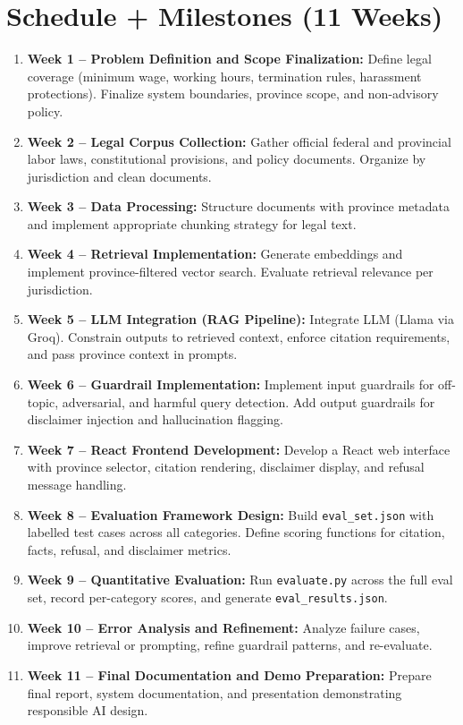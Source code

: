 \documentclass[10pt]{article}
\begin{document}
\section*{Schedule + Milestones (11 Weeks)}
\vspace{12pt}
\begin{enumerate}[leftmargin=*, itemsep=0pt, topsep=1pt]
\item \textbf{Week 1 – Problem Definition and Scope Finalization:} Define legal coverage (minimum wage, working hours, termination rules, harassment protections). Finalize system boundaries, province scope, and non-advisory policy.
\item \textbf{Week 2 – Legal Corpus Collection:} Gather official federal and provincial labor laws, constitutional provisions, and policy documents. Organize by jurisdiction and clean documents.
\item \textbf{Week 3 – Data Processing:} Structure documents with province metadata and implement appropriate chunking strategy for legal text.
\item \textbf{Week 4 – Retrieval Implementation:} Generate embeddings and implement province-filtered vector search. Evaluate retrieval relevance per jurisdiction.
\item \textbf{Week 5 – LLM Integration (RAG Pipeline):} Integrate LLM (Llama via Groq). Constrain outputs to retrieved context, enforce citation requirements, and pass province context in prompts.
\item \textbf{Week 6 – Guardrail Implementation:} Implement input guardrails for off-topic, adversarial, and harmful query detection. Add output guardrails for disclaimer injection and hallucination flagging.
\item \textbf{Week 7 – React Frontend Development:} Develop a React web interface with province selector, citation rendering, disclaimer display, and refusal message handling.
\item \textbf{Week 8 – Evaluation Framework Design:} Build \texttt{eval\_set.json} with labelled test cases across all categories. Define scoring functions for citation, facts, refusal, and disclaimer metrics.
\item \textbf{Week 9 – Quantitative Evaluation:} Run \texttt{evaluate.py} across the full eval set, record per-category scores, and generate \texttt{eval\_results.json}.
\item \textbf{Week 10 – Error Analysis and Refinement:} Analyze failure cases, improve retrieval or prompting, refine guardrail patterns, and re-evaluate.
\item \textbf{Week 11 – Final Documentation and Demo Preparation:} Prepare final report, system documentation, and presentation demonstrating responsible AI design.
\end{enumerate}
\end{document}
